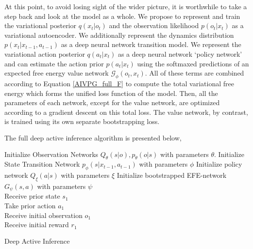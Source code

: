 At this point, to avoid losing sight of the wider picture, it is worthwhile to take a step back and look at the model as a whole. We propose to represent and train the variational posterior $q(x_t | o_t)$ and the observation likelihood $p(o_t | x_t)$ as a variational autoencoder. We additionally represent the dynamics distribution $p(x_t | x_{t-1}, a_{t-1})$ as a deep neural network transition model. We represent the variational action posterior $q(a_t | x_t)$ as a deep neural network `policy network' and can estimate the action prior $p(a_t | x_t)$ using the softmaxed predictions of an expected free energy value network $\mathcal{G}_\phi(o_t,x_t)$. All of these terms are combined according to Equation \ref{AIVPG_full_F} to compute the total variational free energy which forms the unified loss function of the model. Then, all the parameters of each network, except for the value network, are optimized according to a gradient descent on this total loss. The value network, by contrast, is trained using its own separate bootstrapping loss.

The full deep active inference algorithm is presented below,

\begin{algorithm}[H]
\SetAlgoLined
\DontPrintSemicolon
Initialize Observation Networks $Q_\theta(s|o), p_\theta(o|s)$ with parameters $\theta$. 
\BlankLine
Initialize State Transition Network $p_\phi(s|x_{t-1},a_{t-1})$ with parameters $\phi$ 
\BlankLine
Initialize policy network $Q_\xi(a|s)$ with parameters $\xi$
\BlankLine
 Initialize bootstrapped EFE-network $G_\psi(s,a)$ with parameters $\psi$ \\
Receive prior state $s_1$ \\
Take prior action $a_1$ \\
Receive initial observation $o_1$ \\
Receive initial reward $r_1$ \\
\caption{Deep Active Inference}
\end{algorithm}

